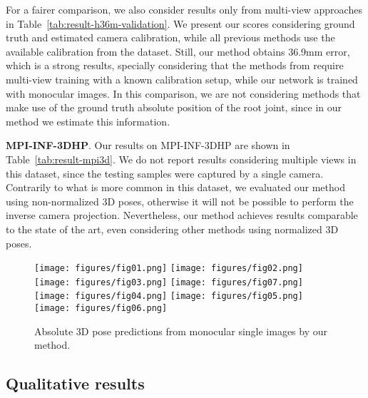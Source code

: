 \documentclass[10pt,twocolumn,letterpaper]{article}
\newcommand{\revb}[1]{{#1}}
\begin{document}
For a fairer comparison, we also consider results only from multi-view
approaches in Table~\ref{tab:result-h36m-validation}. We present our scores
considering ground truth and estimated camera calibration, while all previous
methods use the available calibration from the dataset. Still, our method
obtains 36.9mm error, which \revb{is a strong results, specially considering that
the methods from \cite{iskakov2019learnable, tome2018rethinking} require
multi-view training with a known calibration setup,
while our network is trained with monocular images}.
In this comparison, we are not considering methods that make use of
the ground truth absolute position of the root joint, since in our method
we estimate this information.


\noindent
\textbf{MPI-INF-3DHP}. Our results on MPI-INF-3DHP are shown in Table~\ref{tab:result-mpi3d}.
We do not report results considering multiple views in this dataset,
since the testing samples were captured by a single camera.
Contrarily to what is more common in this dataset, we evaluated our method
using non-normalized 3D poses, otherwise it will not be possible to perform
the inverse camera projection.
Nevertheless, our method achieves results comparable to the state of the art,
even considering other methods using normalized 3D poses.


\begin{figure}[!h]
  \centering
  \texttt{[image: figures/fig01.png]}\hspace{0.05cm}
  \texttt{[image: figures/fig02.png]}\hspace{0.05cm}
  \texttt{[image: figures/fig03.png]}\hspace{0.05cm}
  \texttt{[image: figures/fig07.png]}\\\vspace{0.05cm}
  \texttt{[image: figures/fig04.png]}\hspace{0.05cm}
  \texttt{[image: figures/fig05.png]}\hspace{0.05cm} 
  \texttt{[image: figures/fig06.png]}
  \caption{Absolute 3D pose predictions from monocular single images by our method.
  }
  \label{fig:predictions}
\end{figure}


\subsection{Qualitative results}
\end{document}

